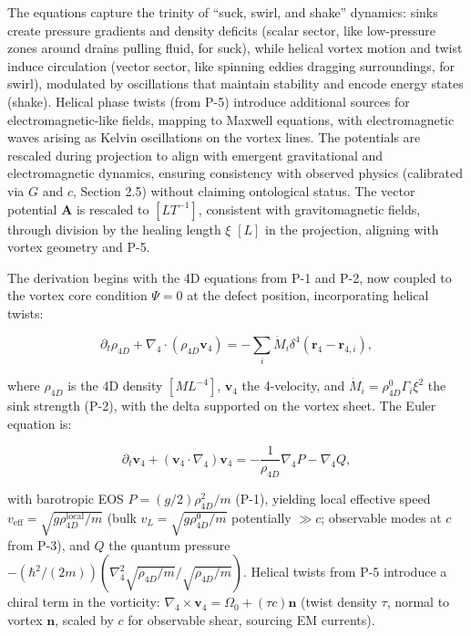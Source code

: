 The equations capture the trinity of ``suck, swirl, and shake'' dynamics: sinks create pressure gradients and density deficits (scalar sector, like low-pressure zones around drains pulling fluid, for suck), while helical vortex motion and twist induce circulation (vector sector, like spinning eddies dragging surroundings, for swirl), modulated by oscillations that maintain stability and encode energy states (shake). Helical phase twists (from P-5) introduce additional sources for electromagnetic-like fields, mapping to Maxwell equations, with electromagnetic waves arising as Kelvin oscillations on the vortex lines. The potentials are rescaled during projection to align with emergent gravitational and electromagnetic dynamics, ensuring consistency with observed physics (calibrated via $G$ and $c$, Section 2.5) without claiming ontological status. The vector potential $\mathbf{A}$ is rescaled to $[L T^{-1}]$, consistent with gravitomagnetic fields, through division by the healing length $\xi$ $[L]$ in the projection, aligning with vortex geometry and P-5.

The derivation begins with the 4D equations from P-1 and P-2, now coupled to the vortex core condition $\Psi=0$ at the defect position, incorporating helical twists:

\begin{equation}
\partial_t \rho_{4D} + \nabla_4 \cdot (\rho_{4D} \mathbf{v}_4) = -\sum_i \dot{M}_i \delta^4(\mathbf{r}_4 - \mathbf{r}_{4,i}),
\end{equation}

where $\rho_{4D}$ is the 4D density $[M L^{-4}]$, $\mathbf{v}_4$ the 4-velocity, and $\dot{M}_i = \rho_{4D}^0 \Gamma_i \xi^2$ the sink strength (P-2), with the delta supported on the vortex sheet. The Euler equation is:

\begin{equation}
\partial_t \mathbf{v}_4 + (\mathbf{v}_4 \cdot \nabla_4) \mathbf{v}_4 = -\frac{1}{\rho_{4D}} \nabla_4 P - \nabla_4 Q,
\end{equation}

with barotropic EOS $P = (g/2) \rho_{4D}^2 / m$ (P-1), yielding local effective speed $v_{\text{eff}} = \sqrt{g \rho_{4D}^{\text{local}} / m}$ (bulk $v_L = \sqrt{g \rho_{4D}^0 / m}$ potentially $\gg c$; observable modes at $c$ from P-3), and $Q$ the quantum pressure $-(\hbar^2 / (2m)) (\nabla_4^2 \sqrt{\rho_{4D}/m} / \sqrt{\rho_{4D}/m})$. Helical twists from P-5 introduce a chiral term in the vorticity: $\nabla_4 \times \mathbf{v}_4 = \Omega_0 + (\tau c) \mathbf{n}$ (twist density $\tau$, normal to vortex $\mathbf{n}$, scaled by $c$ for observable shear, sourcing EM currents).

